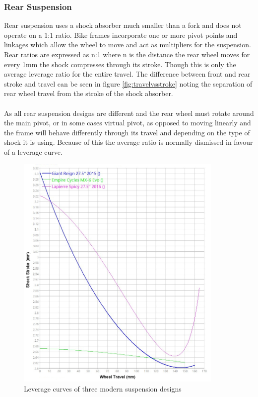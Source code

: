 	\subsubsection{Rear Suspension}
		Rear suspension uses a shock absorber much smaller than a \gls{fork} and does not operate on a 1:1 ratio. Bike frames incorporate one or more pivot points and linkages which allow the wheel to move and act as multipliers for the suspension. Rear ratios are expressed as n:1 where n is the distance the rear wheel moves for every 1mm the shock compresses through its stroke. Though this is only the average leverage ratio for the entire travel. The difference between front and rear stroke and travel can be seen in figure \ref{fig:travelvsstroke} noting the separation of rear wheel travel from the stroke of the shock absorber.
		\\\\
		As all rear suspension designs are different and the rear wheel must rotate around the main 
		pivot, or in some cases virtual pivot, as opposed to moving linearly and the frame will behave differently through its travel and depending on the type of \gls{shock} it is using. Because of this the average ratio is normally dismissed in favour of a leverage curve.
		\begin{figure}[h!]
			\centering
			\includegraphics[width=10cm]{../images/3_bike_lev_ratio.jpg}
			\caption{Leverage curves of three modern suspension designs}
			\label{fig:3_bike_lev_ratio}
		\end{figure}
